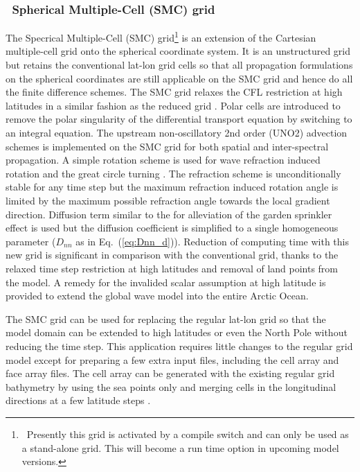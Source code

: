 \vssub
\subsubsection{~Spherical Multiple-Cell (SMC) grid} \label{sub:num_space_SMC}

\noindent
The Specrical Multiple-Cell (SMC) grid\footnote{~Presently this grid is
activated by a compile switch and can only be used as a stand-alone grid. This
will become a run time option in upcoming model versions.}  \citep{art:Li11}
is an extension of the Cartesian multiple-cell grid \citep{art:Li03} onto the
spherical coordinate system. It is an unstructured grid but retains the
conventional lat-lon grid cells so that all propagation formulations on the
spherical coordinates are still applicable on the SMC grid and hence do all
the finite difference schemes. The SMC grid relaxes the CFL restriction at
high latitudes in a similar fashion as the reduced grid
\citep{art:RA94}. Polar cells are introduced to remove the polar singularity
of the differential transport equation by switching to an integral
equation. The upstream non-oscillatory 2nd order (UNO2) advection schemes
\citep{art:Li08} is implemented on the SMC grid for both spatial and
inter-spectral propagation. A simple rotation scheme is used for wave refraction 
induced rotation and the great circle turning \citep{art:Li12}.  The refraction
scheme is unconditionally stable for any time step but the maximum refraction 
induced rotation angle is limited by the maximum possible refraction angle 
towards the local gradient direction.  Diffusion term similar to the 
\cite{art:BH87} for alleviation of the garden sprinkler effect is used but
the diffusion coefficient is simplified to a single homogeneous parameter
($D_{nn}$ as in Eq.~(\ref{eq:Dnn_d})).  Reduction of computing time with this
new grid is significant in comparison with the conventional grid, thanks to
the relaxed time step restriction at high latitudes and removal of land points
from the model. A remedy for the invalided scalar assumption at high latitude
is provided to extend the global wave model into the entire Arctic Ocean.

The SMC grid can be used for replacing the regular lat-lon grid so that the
model domain can be extended to high latitudes or even the North Pole without
reducing the time step. This application requires little changes to the
regular grid model except for preparing a few extra input files, including the
cell array and face array files. The cell array can be generated with the
existing regular grid bathymetry by using the sea points only and merging
cells in the longitudinal directions at a few latitude steps \citep{art:Li11}.

